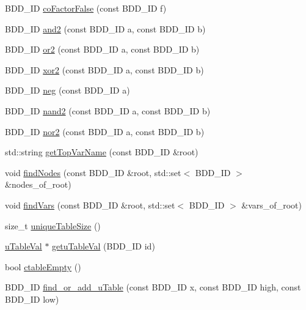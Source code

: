 \begin{DoxyCompactItemize}
B\+D\+D\+\_\+\+ID \hyperlink{classClassProject_1_1Manager_a3e3d13bac159441b8682338fe6a8bcb2}{co\+Factor\+False} (const B\+D\+D\+\_\+\+ID f)
\item 
B\+D\+D\+\_\+\+ID \hyperlink{classClassProject_1_1Manager_a029fff4ef6650e4fd1f0ff37a69252de}{and2} (const B\+D\+D\+\_\+\+ID a, const B\+D\+D\+\_\+\+ID b)
\item 
B\+D\+D\+\_\+\+ID \hyperlink{classClassProject_1_1Manager_a0f415b7af83a3efb6f7020650e68f1c3}{or2} (const B\+D\+D\+\_\+\+ID a, const B\+D\+D\+\_\+\+ID b)
\item 
B\+D\+D\+\_\+\+ID \hyperlink{classClassProject_1_1Manager_a2582e9a9474189a2710c551548c20c19}{xor2} (const B\+D\+D\+\_\+\+ID a, const B\+D\+D\+\_\+\+ID b)
\item 
B\+D\+D\+\_\+\+ID \hyperlink{classClassProject_1_1Manager_ab53a25ffc83724427725347ed3f9e6ce}{neg} (const B\+D\+D\+\_\+\+ID a)
\item 
B\+D\+D\+\_\+\+ID \hyperlink{classClassProject_1_1Manager_abde082c99a3588ad7e25b620e901e6e0}{nand2} (const B\+D\+D\+\_\+\+ID a, const B\+D\+D\+\_\+\+ID b)
\item 
B\+D\+D\+\_\+\+ID \hyperlink{classClassProject_1_1Manager_a1cbba8dc08a8c1bbabce0b98a8fde3be}{nor2} (const B\+D\+D\+\_\+\+ID a, const B\+D\+D\+\_\+\+ID b)
\item 
std\+::string \hyperlink{classClassProject_1_1Manager_a72e49c79e186bfce423eb554cca28ff2}{get\+Top\+Var\+Name} (const B\+D\+D\+\_\+\+ID \&root)
\item 
void \hyperlink{classClassProject_1_1Manager_a2aefec8f025f8d7417eff8493bcd7f04}{find\+Nodes} (const B\+D\+D\+\_\+\+ID \&root, std\+::set$<$ B\+D\+D\+\_\+\+ID $>$ \&nodes\+\_\+of\+\_\+root)
\item 
void \hyperlink{classClassProject_1_1Manager_abf869470f4d1baffca8a140d3196c2ad}{find\+Vars} (const B\+D\+D\+\_\+\+ID \&root, std\+::set$<$ B\+D\+D\+\_\+\+ID $>$ \&vars\+\_\+of\+\_\+root)
\item 
size\+\_\+t \hyperlink{classClassProject_1_1Manager_a82b10a42ec726d42ea4d2e8bc72a3db9}{unique\+Table\+Size} ()
\item 
\hyperlink{structClassProject_1_1uTableVal}{u\+Table\+Val} $\ast$ \hyperlink{classClassProject_1_1Manager_ac08dabf8fdbc314abf2f9a566089c9c7}{getu\+Table\+Val} (B\+D\+D\+\_\+\+ID id)
\item 
bool \hyperlink{classClassProject_1_1Manager_a8be64b55798d49545a549266ae1e9281}{ctable\+Empty} ()
\item 
B\+D\+D\+\_\+\+ID \hyperlink{classClassProject_1_1Manager_a35b9aaf1d448fdbdc2020b119d729527}{find\+\_\+or\+\_\+add\+\_\+u\+Table} (const B\+D\+D\+\_\+\+ID x, const B\+D\+D\+\_\+\+ID high, const B\+D\+D\+\_\+\+ID low)
\end{DoxyCompactItemize}


